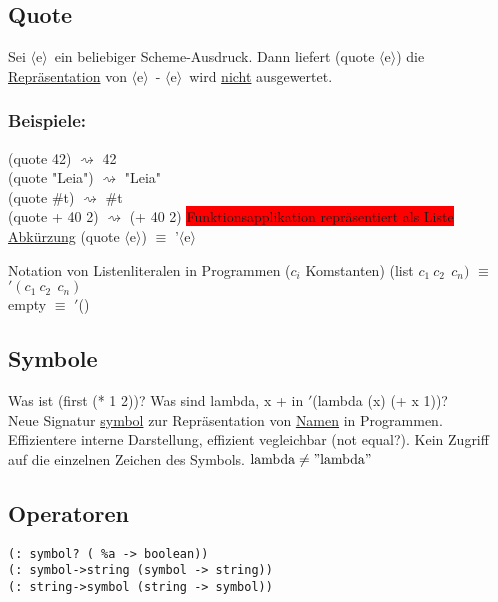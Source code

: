\documentclass[a4paper,12pt]{article}
\newcommand{\la}{$\langle$}
\newcommand{\ra}{$\rangle$}
\begin{document}
\subsection{Quote}
Sei \la e\ra\ ein beliebiger Scheme-Ausdruck. Dann liefert (quote \la e\ra) die \uline{Repräsentation} von \la e\ra\ - \la e\ra\ wird \uline{nicht} ausgewertet.
\subsubsection{Beispiele:}
(quote 42) $\rightsquigarrow$ 42\\
(quote "Leia") $\rightsquigarrow$ "Leia"\\
(quote  \#t) $\rightsquigarrow$ \#t\\
(quote + 40 2) $\rightsquigarrow$ (+ 40 2) \colorbox{red}{Funktionsapplikation repräsentiert als Liste}\\
\uline{Abkürzung} (quote \la e\ra) $\equiv$ '\la e\ra

Notation von Listenliteralen in Programmen ($c_i$ Komstanten)
(list $c_1 \ c_2 \ \ c_n)$ $\equiv$ $'(c_1 \ c_2 \ \ c_n)$\\
empty $\equiv$ $'$()
\subsection{Symbole}
Was ist (first (* 1 2))? Was sind lambda, x + in $'$(lambda (x) (+ x 1))?\\
Neue Signatur \uline{symbol} zur Repräsentation von \uline{Namen} in Programmen. Effizientere interne Darstellung, effizient vegleichbar (not equal?). Kein Zugriff auf die einzelnen Zeichen des Symbols.
$\text{lambda}\neq "\text{lambda}"$
\subsection{Operatoren}
\begin{lstlisting}[style=customc]
(: symbol? ( %a -> boolean))
(: symbol->string (symbol -> string))
(: string->symbol (string -> symbol))
\end{lstlisting}
\end{document}
